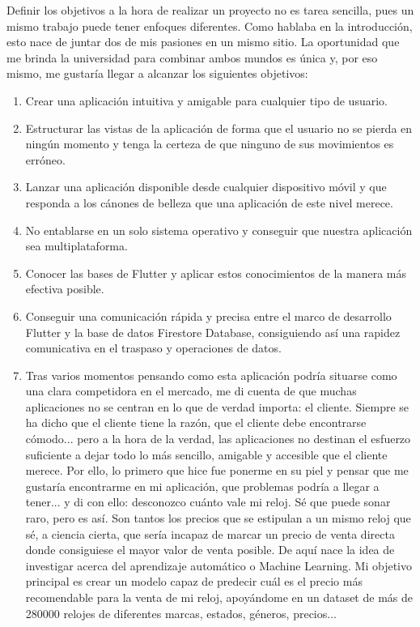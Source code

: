 
	Definir los objetivos a la hora de realizar un proyecto no es tarea sencilla, pues un mismo trabajo puede tener enfoques diferentes. Como hablaba en la introducción, esto nace de juntar dos de mis pasiones en un mismo sitio. La oportunidad que me brinda la universidad para combinar ambos mundos es única y, por eso mismo, me gustaría llegar a alcanzar los siguientes objetivos:

\begin{enumerate}
	\item Crear una aplicación intuitiva y amigable para cualquier tipo de usuario.
	\item Estructurar las vistas de la aplicación de forma que el usuario no se pierda en ningún momento y tenga la certeza de que ninguno de sus movimientos es erróneo.
	\item Lanzar una aplicación disponible desde cualquier dispositivo móvil y que responda a los cánones de belleza que una aplicación de este nivel merece.
	\item No entablarse en un solo sistema operativo y conseguir que nuestra aplicación sea multiplataforma.
	\item Conocer las bases de Flutter y aplicar estos conocimientos de la manera más efectiva posible.
	\item Conseguir una comunicación rápida y precisa entre el marco de desarrollo Flutter y la base de datos Firestore Database, consiguiendo así una rapidez comunicativa en el traspaso y operaciones de datos.
	\item 	Tras varios momentos pensando como esta aplicación podría situarse como una clara competidora en el mercado, me di cuenta de que muchas aplicaciones no se centran en lo que de verdad importa: el cliente. Siempre se ha dicho que el cliente tiene la razón, que el cliente debe encontrarse cómodo... pero a la hora de la verdad, las aplicaciones no destinan el esfuerzo suficiente a dejar todo lo más sencillo, amigable y accesible que el cliente merece. Por ello, lo primero que hice fue ponerme en su piel y pensar que me gustaría encontrarme en mi aplicación, que problemas podría a llegar a tener... y di con ello: desconozco cuánto vale mi reloj. Sé que puede sonar raro, pero es así. Son tantos los precios que se estipulan a un mismo reloj que sé, a ciencia cierta, que sería incapaz de marcar un precio de venta directa donde consiguiese el mayor valor de venta posible. De aquí nace la idea de investigar acerca del aprendizaje automático o Machine Learning. Mi objetivo principal es crear un modelo capaz de predecir cuál es el precio más recomendable para la venta de mi reloj, apoyándome en un dataset de más de 280000 relojes de diferentes marcas, estados, géneros, precios...

\end{enumerate}
